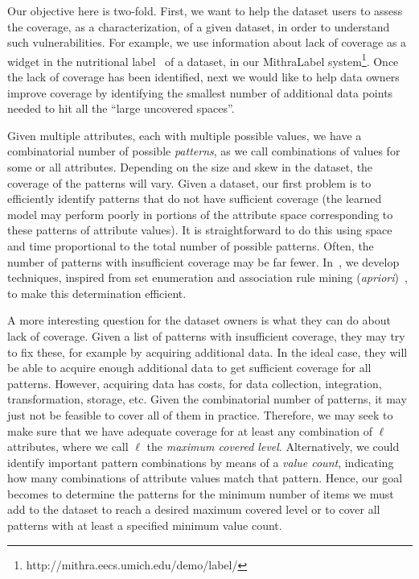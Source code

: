 Our objective here is two-fold.
First, we want to help the dataset users to  assess the coverage, as a characterization, of a given dataset, in order to understand such vulnerabilities.
For example, we use information about lack of coverage as a widget in the nutritional label~\cite{yang2018nutritional} of a dataset, in our MithraLabel system\footnote{http://mithra.eecs.umich.edu/demo/label/}\cite{sun2019mithralabel}.
Once the lack of coverage has been identified, next we would like to help data owners improve coverage by identifying the smallest number of additional data points needed to hit all the ``large uncovered spaces''.


Given multiple attributes, each with multiple possible values, we have a combinatorial number of possible {\em patterns}, as we call  combinations of values for some or all attributes.  Depending on the size and skew in the dataset, the coverage of the patterns will vary.  Given a dataset, our first problem is to efficiently identify patterns that do not have sufficient coverage (the learned model may perform poorly in portions of the attribute space corresponding to these patterns of attribute values).  It is straightforward to do this using space and time proportional to the total number of possible patterns.  Often, the number of patterns with insufficient coverage may be far fewer.  In~\cite{asudeh2019assessing}, we develop techniques, inspired from set enumeration and association rule mining ({\em apriori})~\cite{apriori}, to make this determination efficient.

A more interesting question for the dataset owners is what they can do about lack of coverage.
Given a list of patterns with insufficient coverage, they may try to fix these, for example by acquiring additional data.  In the ideal case, they will be able to acquire enough additional data to get sufficient coverage for all patterns.  However, acquiring data has costs, for data collection, integration, transformation, storage, etc.  Given the combinatorial number of patterns, it may just not be feasible to cover all of them in practice.  Therefore, we may seek to make sure that we have adequate coverage for at least any combination of $\ell$ attributes, where we call $\ell$ the {\em maximum covered level}.
Alternatively, we could identify important pattern combinations by means of a {\em value count}, indicating how many combinations of attribute values match that pattern.
Hence, our goal becomes to determine the patterns for the minimum number of items we must add to the dataset to reach a desired maximum covered level or to cover all patterns with at least a specified minimum value count.

